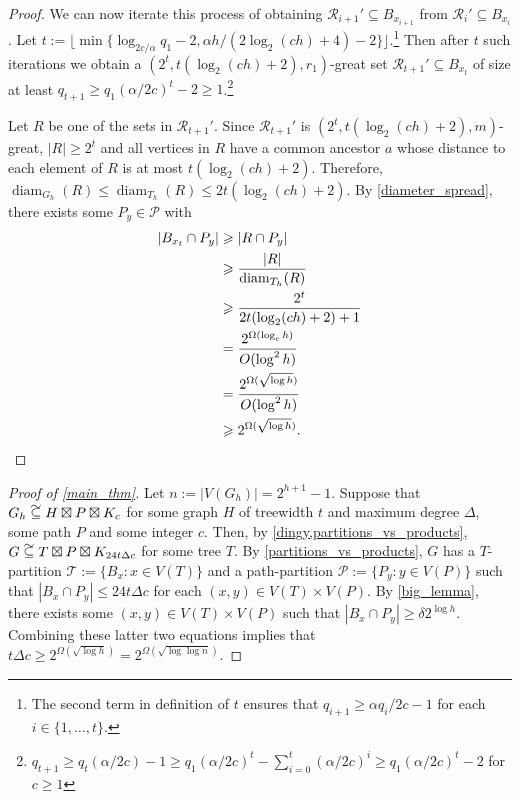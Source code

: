 \documentclass{patmorin}
\DeclareMathOperator{\diam}{diam}
\newcommand\subsetcong{\mathrel{\text{%
    \setbox0\hbox{$\subseteq$}%
    \rlap{\hbox to \wd0{\hss\hss\hss\raisebox{1.5\height}{$\sim$}\hss}}\box0
}}}
\renewcommand{\le}{\leqslant}
\renewcommand{\ge}{\geqslant}
\begin{document}
\begin{proof}
  We can now iterate this process of obtaining $\mathcal{R}_{i+1}'\subseteq B_{x_{i+1}}$ from $\mathcal{R}_i'\subseteq B_{x_i}$. Let $t:= \lfloor \min\{\log_{2c/\alpha} q_1-2,\alpha h/(2\log_2(ch)+4)-2\}\rfloor$.\footnote{The second term in definition of $t$ ensures that $q_{i+1}\ge \alpha q_i/2c-1$ for each $i\in\{1,\ldots,t\}$.}   Then after $t$ such iterations we obtain a $(2^t,t(\log_2(ch)+2),r_1)$-great set $\mathcal{R}_{t+1}'\subseteq B_{x_t}$ of size at least $q_{t+1} \ge q_1(\alpha/2c)^t-2 \ge 1$.\footnote{$q_{t+1} \ge q_t(\alpha/2c) - 1 \ge q_1(\alpha/2c)^t - \sum_{i=0}^t (\alpha/2c)^i \ge q_1(\alpha/2c)^t - 2$ for $c\ge 1$}

  Let $R$ be one of the sets in $\mathcal{R}_{t+1}'$.  Since $\mathcal{R}_{t+1}'$ is $(2^t,t(\log_2(ch)+2),m)$-great, $|R|\ge 2^t$ and all vertices in $R$ have a common ancestor $a$ whose distance to each element of $R$ is at most $t(\log_2(ch)+2)$.  Therefore, $\diam_{G_h}(R)\le\diam_{T_h}(R)\le 2t(\log_2(ch)+2)$. By \cref{diameter_spread}, there exists some $P_y\in\mathcal{P}$ with
  \begin{align*}
    |B_{x_t}\cap P_y|
    & \ge |R\cap P_y| \\
    & \ge \frac{|R|}{\diam_{T_h}(R)} \\
    & \ge \frac{2^t}{2t(\log_2(ch)+2)+1} \\
    & = \frac{2^{\Omega(\log_{c} h)}}{O(\log^2 h)} \\
    & = \frac{2^{\Omega(\sqrt{\log h})}}{O(\log^2 h)} \\
    & \ge 2^{\Omega(\sqrt{\log h})} . \qedhere
  \end{align*}
\end{proof}


\begin{proof}[Proof of \cref{main_thm}]
  Let $n:=|V(G_h)|=2^{h+1}-1$.  Suppose that $G_h\subsetcong H\boxtimes P\boxtimes K_c$ for some graph $H$ of treewidth $t$ and maximum degree $\Delta$, some path $P$ and some integer $c$.  Then, by \cref{dingy,partitions_vs_products}, $G\subsetcong T\boxtimes P\boxtimes K_{24t\Delta c}$ for some tree $T$.  By \cref{partitions_vs_products}, $G$ has a $T$-partition $\mathcal{T}:=\{B_x:x\in V(T)\}$ and a path-partition $\mathcal{P}:=\{P_y:y\in V(P)\}$ such that $|B_x\cap P_y|\le 24t\Delta c$ for each $(x,y)\in V(T)\times V(P)$.  By \cref{big_lemma}, there exists some $(x,y)\in V(T)\times V(P)$ such that $|B_x\cap P_y| \ge \delta 2^{\log h}$.  Combining these latter two equations implies that $t\Delta c\ge 2^{\Omega(\sqrt{\log h})} = 2^{\Omega(\sqrt{\log\log n})}$.
\end{proof}
\end{document}

